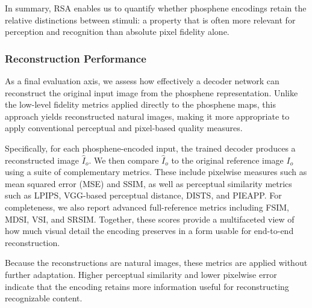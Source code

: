 In summary, RSA enables us to quantify whether phosphene encodings retain the relative distinctions between stimuli: a property that is often more relevant for perception and recognition than absolute pixel fidelity alone.

\subsubsection{Reconstruction Performance}
As a final evaluation axis, we assess how effectively a decoder network can reconstruct the original input image from the phosphene representation. Unlike the low-level fidelity metrics applied directly to the phosphene maps, this approach yields reconstructed natural images, making it more appropriate to apply conventional perceptual and pixel-based quality measures.

Specifically, for each phosphene-encoded input, the trained decoder produces a reconstructed image \(\hat{I}_o\). We then compare \(\hat{I}_o\) to the original reference image \(I_o\) using a suite of complementary metrics. These include pixelwise measures such as mean squared error (MSE) and SSIM, as well as perceptual similarity metrics such as LPIPS, VGG-based perceptual distance, DISTS, and PIEAPP. For completeness, we also report advanced full-reference metrics including FSIM, MDSI, VSI, and SRSIM. Together, these scores provide a multifaceted view of how much visual detail the encoding preserves in a form usable for end-to-end reconstruction.

Because the reconstructions are natural images, these metrics are applied without further adaptation. Higher perceptual similarity and lower pixelwise error indicate that the encoding retains more information useful for reconstructing recognizable content.
